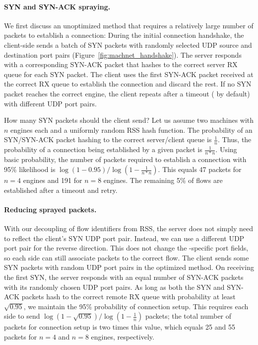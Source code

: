 \paragraph{SYN and SYN-ACK spraying.}
We first discuss an unoptimized method that requires a relatively large number of packets to establish a connection:
During the initial connection handshake, the client-side \mt{} sends a batch of SYN packets with randomly selected UDP source and destination port pairs (Figure~\ref{fig:machnet_handshake}).
The server responds with a corresponding SYN-ACK packet that hashes to the correct server RX queue for each SYN packet.
The client uses the first SYN-ACK packet received at the correct RX queue to establish the connection and discard the rest.
If no SYN packet reaches the correct engine, the client repeats after a timeout ( by default) with different UDP port pairs.

How many SYN packets should the client send?
Let us assume two \mt{} machines with $n$ engines each and a uniformly random RSS hash function.
The probability of an SYN/SYN-ACK packet hashing to the correct server/client queue is $\frac{1}{n}$.
Thus, the probability of a connection being established by a given packet is $\frac{1}{n*n}$.
Using basic probability, the number of packets required to establish a connection with 95\% likelihood is $\log(1-0.95)/\log(1-\frac{1}{n*n})$.
This equals 47 packets for $n=4$ engines and 191  for $n=8$ engines.
The remaining 5\% of flows are established after a timeout and retry.

\paragraph{Reducing sprayed packets.}
With our decoupling of flow identifiers from RSS, the server does not simply need to reflect the client's SYN UDP port pair.
Instead, we can use a different UDP port pair for the reverse direction.
This does not change the \mt{}-specific port fields, so each side can still associate packets to the correct flow.
The client sends some SYN packets with random UDP port pairs in the optimized method.
On receiving the first SYN, the server responds with an equal number of SYN-ACK packets with its randomly chosen UDP port pairs.
As long as both the SYN and SYN-ACK packets hash to the correct remote RX queue with probability at least $\sqrt{0.95}$, we maintain the 95\% probability of connection setup.
This requires each side to send $\log(1-\sqrt{0.95})/\log(1-\frac{1}{n})$ packets; the total number of packets for connection setup is two times this value, which equals 25 and 55 packets for $n=4$ and $n=8$ engines, respectively.

